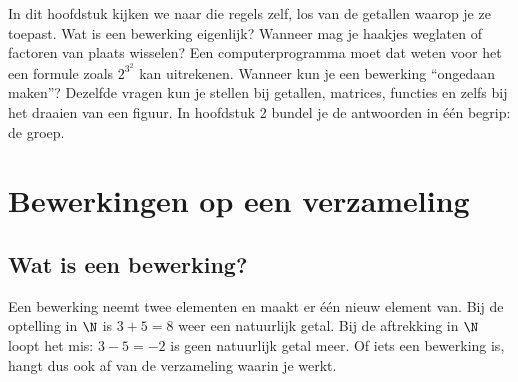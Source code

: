 In dit hoofdstuk kijken we naar die regels zelf, los van de getallen waarop je ze toepast. Wat is een bewerking eigenlijk? Wanneer mag je haakjes weglaten of factoren van plaats wisselen? Een computerprogramma moet dat weten voor het een formule zoals $2^{3^2}$ kan uitrekenen. Wanneer kun je een bewerking ``ongedaan maken''? Dezelfde vragen kun je stellen bij getallen, matrices, functies en zelfs bij het draaien van een figuur. In hoofdstuk 2 bundel je de antwoorden in één begrip: de groep.

\begin{oefeningen}[Start]

\end{oefeningen}


\section{Bewerkingen op een verzameling}

\subsection{Wat is een bewerking?}

Een bewerking neemt twee elementen en maakt er één nieuw element van. Bij de optelling in $\N$ is $3 + 5 = 8$ weer een natuurlijk getal. Bij de aftrekking in $\N$ loopt het mis: $3 - 5 = -2$ is geen natuurlijk getal meer. Of iets een bewerking is, hangt dus ook af van de verzameling waarin je werkt.

